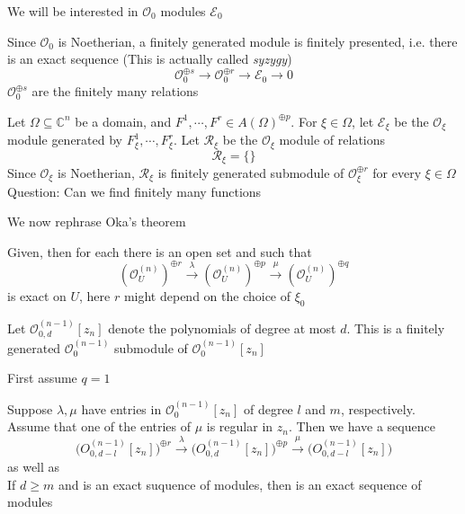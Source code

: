 \documentclass[../main.tex]{subfiles}
\begin{document}
We will be interested in $\mathcal O_0$ modules $\mathcal E_0$

Since $\mathcal O_0$ is Noetherian, a finitely generated module is finitely presented, i.e. there is an exact sequence (This is actually called \textit{syzygy})
\[\mathcal O^{\oplus s}_0\to\mathcal O^{\oplus r}_0\to\mathcal E_0\to0\]
$\mathcal O^{\oplus s}_0$ are the finitely many relations

Let $\Omega\subseteq\mathbb C^n$ be a domain, and $F^1,\cdots, F^r\in A(\Omega)^{\oplus p}$. For $\xi\in\Omega$, let $\mathcal E_\xi$ be the $\mathcal O_\xi$ module generated by $F^1_\xi,\cdots,F^r_\xi$. Let $\mathcal R_\xi$ be the $\mathcal O_\xi$ module of relations
\[\mathcal R_\xi=\{\}\]
Since $\mathcal O_\xi$ is Noetherian, $\mathcal R_\xi$ is finitely generated submodule of $\mathcal O_\xi^{\oplus r}$ for every $\xi\in\Omega$
Question: Can we find finitely many functions

We now rephrase Oka's theorem

\begin{theorem}
Given, then for each there is an open set and such that
\[(\mathcal O^{(n)}_U)^{\oplus r}\xrightarrow\lambda(\mathcal O^{(n)}_U)^{\oplus p}\xrightarrow\mu(\mathcal O^{(n)}_U)^{\oplus q}\]
is exact on $U$, here $r$ might depend on the choice of $\xi_0$
\end{theorem}

Let $\mathcal O^{(n-1)}_{0,d}[z_n]$ denote the polynomials of degree at most $d$. This is a finitely generated $\mathcal O^{(n-1)}_0$ submodule of $\mathcal O^{(n-1)}_0[z_n]$

First assume $q=1$
\begin{lemma}
Suppose $\lambda,\mu$ have entries in $\mathcal O^{(n-1)}_0[z_n]$ of degree $l$ and $m$, respectively. Assume that one of the entries of $\mu$ is regular in $z_n$. Then we have a sequence
\begin{equation}\label{Lemma for oka's theorem 1}
\mathcal (O^{(n-1)}_{0,d-l}[z_n])^{\oplus r}\xrightarrow\lambda\mathcal (O^{(n-1)}_{0,d}[z_n])^{\oplus p}\xrightarrow\mu\mathcal (O^{(n-1)}_{0,d-l}[z_n])
\end{equation}
as well as
\begin{equation}\label{Lemma for oka's theorem 2}

\end{equation}
If $d\geq m$ and is an exact suquence of modules, then is an exact sequence of modules
\end{lemma}
\end{document}
